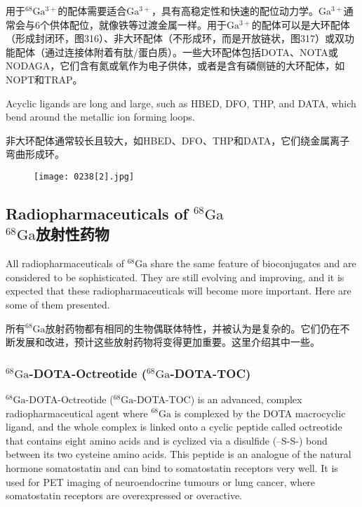 \documentclass[dvipsnames, svgnames,a4paper,11pt]{article}
\begin{document}
用于\(\mathrm{^{68}Ga^{3+}}\)的配体需要适合\(\mathrm{Ga^{3+}}\)，具有高稳定性和快速的配位动力学。\(\mathrm{Ga^{3+}}\)通常会与6个供体配位，就像铁等过渡金属一样。用于\(\mathrm{Ga^{3+}}\)的配体可以是大环配体（形成封闭环，图316）、非大环配体（不形成环，而是开放链状，图317）或双功能配体（通过连接体附着有肽/蛋白质）。一些大环配体包括DOTA、NOTA或NODAGA，它们含有氮或氧作为电子供体，或者是含有磷侧链的大环配体，如NOPT和TRAP。

Acyclic ligands are long and large, such as HBED, DFO, THP, and DATA, which bend around the metallic ion forming loops.

非大环配体通常较长且较大，如HBED、DFO、THP和DATA，它们绕金属离子弯曲形成环。

\begin{figure}[h]
	\centering
    \texttt{[image: 0238[2].jpg]}  
     \label{fig317}
\end{figure}

\subsection{Radiopharmaceuticals of \(\mathrm{^{68}Ga}\)\\ \(\mathrm{^{68}Ga}\)放射性药物}  
All radiopharmaceuticals of \(\mathrm{^{68}Ga}\) share the same feature of bioconjugates and are considered to be sophisticated. They are still evolving and improving, and it is expected that these radiopharmaceuticals will become more important. Here are some of them presented.

所有\(\mathrm{^{68}Ga}\)放射药物都有相同的生物偶联体特性，并被认为是复杂的。它们仍在不断发展和改进，预计这些放射药物将变得更加重要。这里介绍其中一些。

\subsubsection{\(\mathrm{^{68}Ga}\)-DOTA-Octreotide (\(\mathrm{^{68}Ga}\)-DOTA-TOC)}  
\(\mathrm{^{68}Ga}\)-DOTA-Octreotide (\(\mathrm{^{68}Ga}\)-DOTA-TOC) is an advanced, complex radiopharmaceutical agent where \(\mathrm{^{68}Ga}\) is complexed by the DOTA macrocyclic ligand, and the whole complex is linked onto a cyclic peptide called octreotide that contains eight amino acids and is cyclized via a disulfide (–S-S-) bond between its two cysteine amino acids. This peptide is an analogue of the natural hormone somatostatin and can bind to somatostatin receptors very well. It is used for PET imaging of neuroendocrine tumours or lung cancer, where somatostatin receptors are overexpressed or overactive.
\end{document}
